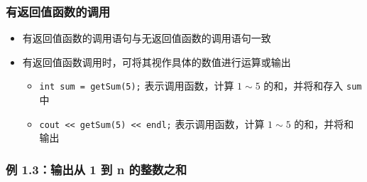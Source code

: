 \begin{frame}[fragile]
    \frametitle{有返回值函数的调用}

    \begin{itemize}[<+->]
        \item 有返回值函数的调用语句与无返回值函数的调用语句一致
        \item 有返回值函数调用时，可将其视作具体的数值进行运算或输出
        \begin{itemize}
            \item \lstinline|int sum = getSum(5);| 表示调用函数，计算 $1 \sim 5$ 的和，并将和存入 \lstinline|sum| 中
            \item \lstinline|cout << getSum(5) << endl;| 表示调用函数，计算 $1 \sim 5$ 的和，并将和输出
        \end{itemize}
    \end{itemize}
\end{frame}

\begin{frame}[fragile]
    \frametitle{例 1.3：输出从 1 到 n 的整数之和}
    
    
\end{frame}


